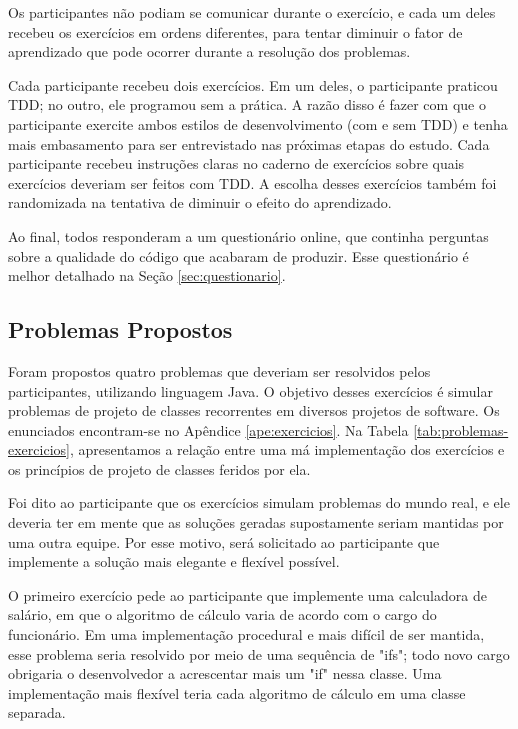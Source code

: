 Os participantes não podiam se comunicar durante o exercício, e cada um deles recebeu
os exercícios em ordens diferentes, para tentar diminuir o fator de aprendizado que 
pode ocorrer durante a resolução dos problemas. 

Cada participante recebeu dois exercícios. Em um deles, o participante praticou TDD; no outro,
ele programou sem a prática. A razão disso
é fazer com que o participante exercite ambos estilos de desenvolvimento (com e sem TDD)
e tenha mais embasamento para ser entrevistado nas próximas etapas do estudo. 
Cada participante recebeu instruções claras no caderno de exercícios 
sobre quais exercícios deveriam ser feitos
com TDD. A escolha desses exercícios também foi randomizada na tentativa de diminuir
o efeito do aprendizado.

Ao final, todos responderam a um questionário online, 
que continha perguntas sobre a qualidade
do código que acabaram de produzir. Esse questionário
é melhor detalhado na Seção \ref{sec:questionario}.

\subsection{Problemas Propostos}
\label{sec:exercicios}

Foram propostos quatro problemas que deveriam ser resolvidos pelos participantes, utilizando
linguagem Java. O objetivo desses exercícios é simular problemas de projeto de classes 
recorrentes em diversos projetos de software. Os enunciados encontram-se no Apêndice 
\ref{ape:exercicios}.
Na Tabela \ref{tab:problemas-exercicios}, apresentamos a relação entre uma má
implementação dos exercícios e os princípios de projeto de classes feridos por
ela.

Foi dito ao participante que os exercícios simulam problemas do mundo real, e ele deveria
ter em mente que as soluções geradas supostamente seriam mantidas por uma outra equipe.
Por esse motivo, será solicitado ao participante que implemente a solução mais elegante e flexível 
possível.

O primeiro exercício pede ao participante que implemente uma calculadora de salário, em que
o algoritmo de cálculo varia de acordo com o cargo do funcionário. Em uma implementação
procedural e mais difícil de ser mantida, esse problema seria resolvido por meio de uma
sequência de "ifs"; todo novo cargo obrigaria o desenvolvedor a acrescentar mais um "if" 
nessa classe. Uma implementação mais flexível teria cada algoritmo de cálculo em uma 
classe separada.

